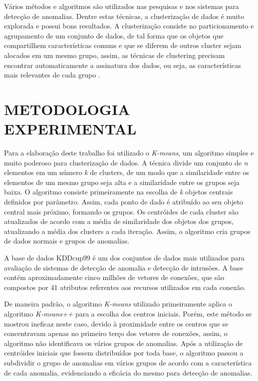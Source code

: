 \documentclass[article,12pt,oneside,a4paper,english,brazil]{unifil}
\begin{document}
\begin{Spacing}{1.5}
Vários métodos e algoritmos são utilizados nas pesquisas e nos sistemas para detecção de anomalias. Dentre estas técnicas, a clusterização de dados é muito explorada e possui bons resultados. A clusterização consiste no particionamento e agrupamento de um conjunto de dados, de tal forma que os objetos que compartilhem características comuns e que se diferem de outros cluster sejam alocados em um mesmo grupo, assim, as técnicas de clustering precisam encontrar automaticamente a assinatura dos dados, ou seja, as características mais relevantes de cada grupo \cite{rehman2009}.

\section*{METODOLOGIA EXPERIMENTAL}

Para a elaboração deste trabalho foi utilizado o \textit{K-means}, um algoritmo simples e muito poderoso para clusterização de dados. A técnica divide um conjunto de \textit{n} elementos em um número \textit{k} de clusters, de um modo que a similaridade entre os elementos de um mesmo grupo seja alta e a similaridade entre os grupos seja baixa. O algoritmo consiste primeiramente na escolha de \textit{k} objetos centrais definidos por parâmetro. Assim, cada ponto de dado é atribuído ao seu objeto central mais próximo, formando os grupos. Os centróides de cada cluster são atualizados de acordo com a média de similaridade dos objetos dos grupos, atualizando a média dos clusters a cada iteração. Assim, o algoritmo cria grupos de dados normais e grupos de anomalias.

A base de dados KDDcup99 é um dos conjuntos de dados mais utilizados para avaliação de sistemas de detecção de anomalia e detecção de intrusões. A base contém aproximadamente cinco milhões de vetores de conexões, que são compostos por 41 atributos referentes aos recursos utilizados em cada conexão.

De maneira padrão, o algoritmo \textit{K-means} utilizado primeiramente aplica o algoritmo \textit{K-means++} \cite{arthur2007} para a escolha dos centros iniciais. Porém, este método se mostrou ineficaz neste caso, devido à proximidade entre os centros que se concentravam apenas no primeiro terço dos vetores de conexões, assim, o algoritmo não identificava os vários grupos de anomalias. Após a utilização de centróides iniciais que fossem distribuídos por toda base, o algoritmo passou a subdividir o grupo de anomalias em vários grupos de acordo com a característica de cada anomalia, evidenciando a eficácia do mesmo para detecção de anomalias.


\end{Spacing}
\end{document}

